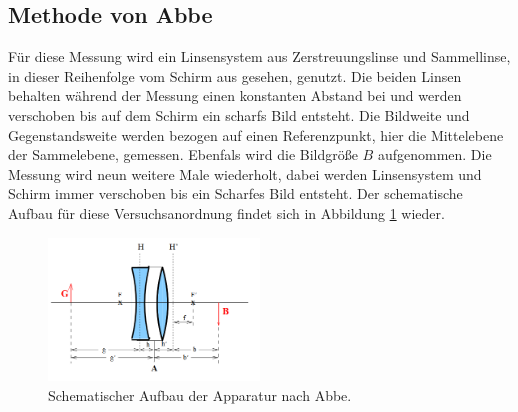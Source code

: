 \subsection{Methode von Abbe}
Für diese Messung wird ein Linsensystem aus Zerstreuungslinse und Sammellinse, in dieser Reihenfolge
vom Schirm aus gesehen, genutzt. Die beiden Linsen behalten während der Messung einen konstanten Abstand
bei und werden verschoben bis auf dem Schirm ein scharfs Bild entsteht. Die Bildweite und Gegenstandsweite
werden bezogen auf einen Referenzpunkt, hier die Mittelebene der Sammelebene, gemessen. Ebenfals wird die
Bildgröße $B$ aufgenommen. Die Messung wird neun weitere Male wiederholt, dabei werden Linsensystem und
Schirm immer verschoben bis ein Scharfes Bild entsteht.
Der schematische Aufbau für diese Versuchsanordnung findet sich in Abbildung \ref{fig:Abbe} wieder.
\begin{figure}
 \centering
 \includegraphics[width=0.5\textwidth]{abbe.png}
 \caption{Schematischer Aufbau der Apparatur nach Abbe.\cite{sample}}
 \label{fig:Abbe}
 \end{figure}
